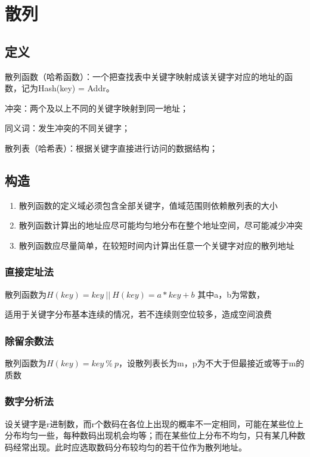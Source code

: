 \section{散列}

\subsection{定义}

散列函数（哈希函数）：一个把查找表中关键字映射成该关键字对应的地址的函数，记为Hash(key) = Addr。

冲突：两个及以上不同的关键字映射到同一地址；

同义词：发生冲突的不同关键字；

散列表（哈希表）：根据关键字直接进行访问的数据结构；


\subsection{构造}
\begin{enumerate}
    \item 散列函数的定义域必须包含全部关键字，值域范围则依赖散列表的大小
    \item 散列函数计算出的地址应尽可能均匀地分布在整个地址空间，尽可能减少冲突
    \item 散列函数应尽量简单，在较短时间内计算出任意一个关键字对应的散列地址
\end{enumerate}

\subsubsection{直接定址法}
散列函数为\(H(key) = key\ ||\ H(key) = a * key + b\)
其中a，b为常数，

适用于关键字分布基本连续的情况，若不连续则空位较多，造成空间浪费


\subsubsection{除留余数法}
散列函数为\(H(key) = key\ \%\ p\)，设散列表长为m，p为不大于但最接近或等于m的质数


\subsubsection{数字分析法}
设关键字是r进制数，而r个数码在各位上出现的概率不一定相同，可能在某些位上分布均匀一些，每种数码出现机会均等；而在某些位上分布不均匀，只有某几种数码经常出现。此时应选取数码分布较均匀的若干位作为散列地址。

